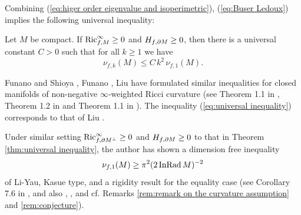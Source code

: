 Combining (\ref{eq:higer order eigenvalue and isoperimetric}), (\ref{eq:Buser Ledoux}) implies the following universal inequality:
\begin{thm}\label{thm:universal inequality}
Let $M$ be compact.
If $\operatorname{Ric}^{\infty}_{f,M}\geq 0$ and $H_{f,\partial M}\geq 0$,
then there is a universal constant $C>0$ such that
for all $k\geq 1$
we have
\begin{equation}\label{eq:universal inequality}
\nu_{f,k}(M)\leq C\,k^{2}\,\nu_{f,1}(M).
\end{equation}
\end{thm}
Funano and Shioya \cite{FSh}, Funano \cite{F}, Liu \cite{Liu} have formulated similar inequalities for closed manifolds of non-negative $\infty$-weighted Ricci curvature (see Theorem 1.1 in \cite{FSh}, Theorem 1.2 in \cite{F} and Theorem 1.1 in \cite{Liu}).
The inequality (\ref{eq:universal inequality}) corresponds to that of Liu \cite{Liu}.

\begin{rem}\label{rem:Li-Yau dimension free}
Under similar setting $\operatorname{Ric}^{\infty}_{f,\partial M^{\perp}}\geq 0$ and $H_{f,\partial M}\geq 0$ to that in Theorem \ref{thm:universal inequality},
the author \cite{S1} has shown a dimension free inequality
\begin{equation}\label{eq:Li-Yau dimension free}
\nu_{f,1}(M)\geq \pi^{2} (2\operatorname{InRad} M)^{-2}
\end{equation}
of Li-Yau, Kasue type,
and a rigidity result for the equality case (see Corollary 7.6 in \cite{S1}, and also \cite{LY}, \cite{K2}, and cf. Remarks \ref{rem:remark on the curvature assumption} and \ref{rem:conjecture}).
\end{rem}

